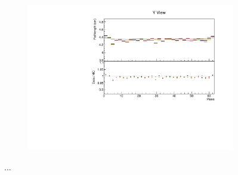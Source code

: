 \documentclass[12pt,a4paper]{article}
\begin{document}
\begin{figure}[!ht]
\begin{subfigure}{0.5\textwidth}
  \end{subfigure}
  \begin{subfigure}{0.5\textwidth}
    \includegraphics[width=\linewidth]{essentialsec_tb/cm_plane_y.pdf}
  \end{subfigure}
  \caption{...}
  \label{figAbsCalibPlane2}
\end{figure}
\end{document}
